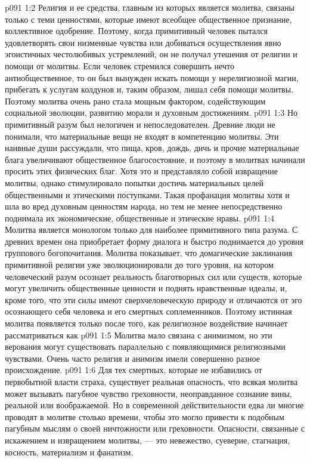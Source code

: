 \vs p091 1:2 \pc Религия и ее средства, главным из которых является молитва, связаны только с теми ценностями, которые имеют всеобщее общественное признание, коллективное одобрение. Поэтому, когда примитивный человек пытался удовлетворять свои низменные чувства или добиваться осуществления явно эгоистичных честолюбивых устремлений, он не получал утешения от религии и помощи от молитвы. Если человек стремился совершить нечто антиобщественное, то он был вынужден искать помощи у нерелигиозной магии, прибегать к услугам колдунов и, таким образом, лишал себя помощи молитвы. Поэтому молитва очень рано стала мощным фактором, содействующим социальной эволюции, развитию морали и духовным достижениям.
\vs p091 1:3 Но примитивный разум был нелогичен и непоследователен. Древние люди не понимали, что материальные вещи не входят в компетенцию молитвы. Эти наивные души рассуждали, что пища, кров, дождь, дичь и прочие материальные блага увеличивают общественное благосостояние, и поэтому в молитвах начинали просить этих физических благ. Хотя это и представляло собой извращение молитвы, однако стимулировало попытки достичь материальных целей общественными и этическими поступками. Такая профанация молитвы хотя и шла во вред духовным ценностям народа, но тем не менее непосредственно поднимала их экономические, общественные и этические нравы.
\vs p091 1:4 Молитва является монологом только для наиболее примитивного типа разума. С древних времен она приобретает форму диалога и быстро поднимается до уровня группового богопочитания. Молитва показывает, что домагические заклинания примитивной религии уже эволюционировали до того уровня, на котором человеческий разум осознает реальность благотворных сил или существ, которые могут увеличить общественные ценности и поднять нравственные идеалы, и, кроме того, что эти силы имеют сверхчеловеческую природу и отличаются от эго осознающего себя человека и его смертных соплеменников. Поэтому истинная молитва появляется только после того, как религиозное воздействие начинает рассматриваться как 
\vs p091 1:5 \pc Молитва мало связана с анимизмом, но эти верования могут существовать параллельно с появляющимися религиозными чувствами. Очень часто религия и анимизм имели совершенно разное происхождение.
\vs p091 1:6 \pc Для тех смертных, которые не избавились от первобытной власти страха, существует реальная опасность, что всякая молитва может вызывать пагубное чувство греховности, неоправданное сознание вины, реальной или воображаемой. Но в современной действительности едва ли многие проводят в молитве столько времени, чтобы это могло привести к подобным пагубным мыслям о своей ничтожности или греховности. Опасности, связанные с искажением и извращением молитвы, --- это невежество, суеверие, стагнация, косность, материализм и фанатизм.
